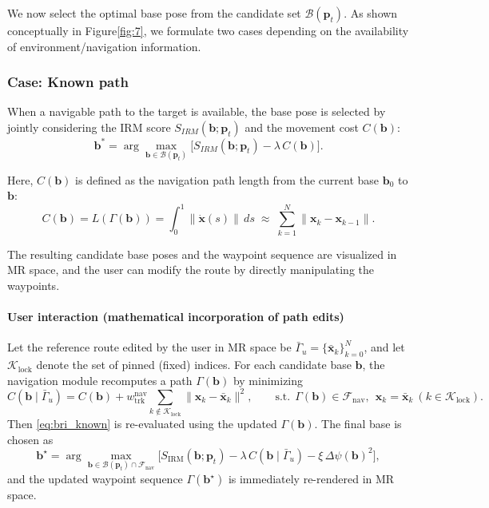 \documentclass[../../main.tex]{subfiles} %
\begin{document}
We now select the optimal base pose from the candidate set $\mathcal{B}(\mathbf{p}_t)$.  
As shown conceptually in Figure\ref{fig:7}, we formulate two cases depending on the availability of 
environment/navigation information.

\subsubsection{Case: Known path}
When a navigable path to the target is available, the base pose is selected by
jointly considering the IRM score $S_{IRM}(\mathbf{b}; \mathbf{p}_t)$ and the
movement cost $C(\mathbf{b})$:
\begin{equation}
\mathbf{b}^{\ast} = \arg\max_{\mathbf{b} \in \mathcal{B}(\mathbf{p}_t)}
\Big[ S_{IRM}(\mathbf{b}; \mathbf{p}_t) - \lambda \, C(\mathbf{b}) \Big].
\label{eq:bri_known}
\end{equation}

Here, $C(\mathbf{b})$ is defined as the navigation path length from the current
base $\mathbf{b}_0$ to $\mathbf{b}$:
\[
C(\mathbf{b})=L(\Gamma(\mathbf{b}))=\int_{0}^{1}\!\bigl\|\dot{\mathbf{x}}(s)\bigr\|\,ds
\;\approx\;\sum_{k=1}^{N}\bigl\|\mathbf{x}_k-\mathbf{x}_{k-1}\bigr\|.
\]

The resulting candidate base poses and the waypoint sequence are visualized in MR space,
and the user can modify the route by directly manipulating the waypoints.



\paragraph{User interaction (mathematical incorporation of path edits)}
Let the reference route edited by the user in MR space be
$\bar{\Gamma}_{u}=\{\bar{\mathbf{x}}_k\}_{k=0}^{N}$, and let
$\mathcal{K}_{\mathrm{lock}}$ denote the set of pinned (fixed) indices.
For each candidate base $\mathbf{b}$, the navigation module recomputes a path
$\Gamma(\mathbf{b})$ by minimizing
\[
C(\mathbf{b}\mid \bar{\Gamma}_{u})
= C(\mathbf{b})
+ w_{\mathrm{trk}}^{\mathrm{nav}}\!\!\sum_{k\notin \mathcal{K}_{\mathrm{lock}}}\!\!\|\mathbf{x}_k-\bar{\mathbf{x}}_k\|^2,
\qquad
\text{s.t.}\ \ \Gamma(\mathbf{b})\in\mathcal{F}_{\mathrm{nav}},\ \ \mathbf{x}_k=\bar{\mathbf{x}}_k\ (k\in\mathcal{K}_{\mathrm{lock}}).
\]
Then \eqref{eq:bri_known} is re-evaluated using the updated $\Gamma(\mathbf{b})$.
The final base is chosen as
\[
\mathbf{b}^\star
=\arg\max_{\mathbf{b}\in\mathcal{B}(\mathbf{p}_t)\cap\mathcal{F}_{\mathrm{nav}}}
\Big[
S_{\mathrm{IRM}}(\mathbf{b};\mathbf{p}_t) - \lambda\,C(\mathbf{b}\mid\bar{\Gamma}_{u}) - \xi\,\Delta\psi(\mathbf{b})^2
\Big],
\]
and the updated waypoint sequence $\Gamma(\mathbf{b}^\star)$ is immediately re-rendered in MR space.
\end{document}
